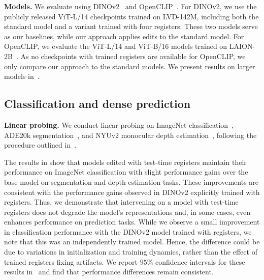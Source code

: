 \documentclass{article}
\newcommand{\amil}[1]{{\color{blue}\textbf{Amil:} #1}}
\newcommand{\amil}[1]{}
\begin{document}
\textbf{Models.} We evaluate using DINOv2~\citep{dinov2} and OpenCLIP~\citep{openclip}. For DINOv2, we use the publicly released ViT-L/14 checkpoints trained on LVD-142M, including both the standard model and a variant trained with four registers. These two models serve as our baselines, while our approach applies edits to the standard model. For OpenCLIP, we evaluate the ViT-L/14 and ViT-B/16 models trained on LAION-2B~\citep{schuhmann2022laion}. As no checkpoints with trained registers are available for OpenCLIP, we only compare our approach to the standard models. We present results on larger models in~.%







\subsection{Classification and dense prediction}
\label{sec:dense_prediction}
\textbf{Linear probing.} We conduct linear probing on ImageNet classification~\citep{imagenet}, ADE20k segmentation~\citep{ade20k}, and NYUv2 monocular depth estimation~\citep{nyud}, following the procedure outlined in~\citep{dinov2, darcet2024vision}. 

The results in  show that models edited with test-time registers maintain their performance on ImageNet classification with slight performance gains over the base model on segmentation and depth estimation tasks. 
These improvements are consistent with the performance gains observed in DINOv2 explicitly trained with registers. Thus, we demonstrate that intervening on a model with test-time registers does not degrade the model's representations and, in some cases, even enhances performance on prediction tasks. While we observe a small improvement in classification performance with the DINOv2 model trained with registers, we note that this was an independently trained model. Hence, the difference could be due to variations in initialization and training dynamics, rather than the effect of trained registers fixing artifacts. We report $95\%$ confidence intervals for these results in~ and find that performance differences remain consistent.  
\end{document}
